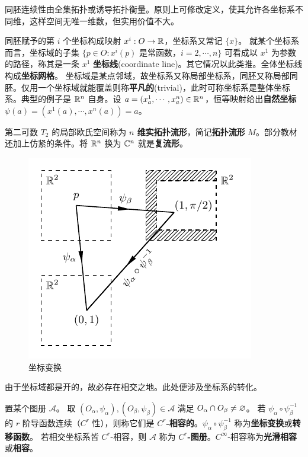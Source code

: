 \begin{remark}
    同胚连续性由全集拓扑或诱导拓扑衡量。原则上可修改定义，使其允许各坐标系不同维，这样空间无唯一维数，但实用价值不大。
\end{remark}

同胚赋予的第 $i$ 个坐标构成映射 $x^i:O\to\mathbb{R}$，坐标系又常记 $\{x\}$。
就某个坐标系而言，坐标域的子集
    $\{p\in O: x^i(p)$ 是常函数，$i=2,\cdots,n\}$
可看成以 $x^1$ 为参数的路径，称其是一条 $x^1$ \textbf{坐标线}(coordinate line)。其它情况以此类推。全体坐标线构成\textbf{坐标网格}。
坐标域是某点邻域，故坐标系又称局部坐标系，同胚又称局部同胚。仅用一个坐标域就能覆盖则称\textbf{平凡的}(trivial)，此时可称坐标系是整体坐标系。典型的例子是 $\mathbb{R}^n$ 自身。设 $a=(x^1_a,\cdots,x^n_a)\in\mathbb{R}^n$，恒等映射给出\textbf{自然坐标} $\psi(a)=(x^1(a),\cdots,x^n(a))=a$。

\begin{definition}
    第二可数 $T_2$ 的局部欧氏空间称为 \textbf{$n$ 维实拓扑流形}，简记\textbf{拓扑流形} $M$。部分教材还加上仿紧的条件。将 $\mathbb{R}^n$ 换为 $\mathbb{C}^n$ 就是\textbf{复流形}。
\end{definition}

\begin{figure}[ht]
    \centering
\includegraphics[width=.4\textwidth]{fig/appx/coor-chan.pdf}
    \caption{坐标变换}\label{fig:coor-chan}
\end{figure}

由于坐标域都是开的，故必存在相交之地。此处便涉及坐标系的转化。

\begin{definition}
    置某个图册 $\mathcal A$。
    取 $(O_\alpha,\psi_\alpha),(O_\beta,\psi_\beta)\in \mathcal A$ 满足 $O_\alpha\cap O_\beta\ne\varnothing$。
    若 $\psi_\alpha\circ\psi_\beta^{-1}$ 的 $r$ 阶导函数连续（$C^r$ 性），则称它们是 $C^r$\textbf{-相容的}。$\psi_\alpha\circ\psi_\beta^{-1}$ 称为\textbf{坐标变换}或\textbf{转移函数}。
    若相交坐标系皆 $C^r$-相容，则 $\mathcal A$ 称为 $C^r$\textbf{-图册}。$C^\infty$-相容称为\textbf{光滑相容}或\textbf{相容}。
\end{definition}

